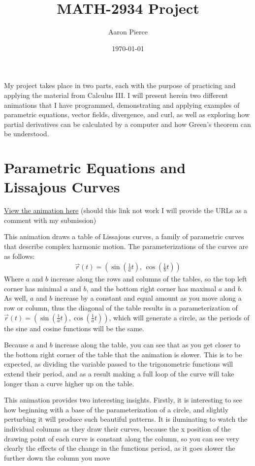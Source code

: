 \documentclass{article}
\title{MATH-2934 Project}
\author{Aaron Pierce}
\date{\today}
\begin{document}
    \maketitle

    My project takes place in two parts, each with the purpose of practicing and applying the material from Calculus III.
    I will present herein two different animations that I have programmed, demonstrating and applying examples of parametric equations, vector fields, divergence, and curl,
    as well as exploring how partial derivatives can be calculated by a computer and how Green's theorem can be understood.

    \section{Parametric Equations and Lissajous Curves}
    \underline{\href{https://saxten2011.github.io/AlmostLissajousCurves/}{View the animation here}} (should this link not work I will provide the URLs as a comment with my submission)

    This animation draws a table of Lissajous curves, a family of parametric curves that describe complex harmonic motion.
    The parameterizations of the curves are as follows:
    \begin{gather*}
        \vec{r}(t) = \left( \sin(\frac{1}{a} t),\, \cos(\frac{1}{b} t) \right)
    \end{gather*}
    Where $a$ and $b$ increase along the rows and columns of the tables, so the top left corner has minimal $a$ and $b$, and the bottom right corner has maximal $a$ and $b$.
    As well, $a$ and $b$ increase by a constant and equal amount as you move along a row or column, thus the diagonal of the table results in a parameterization of 
    $\vec{r}(t) = \left( \sin(\frac{1}{a} t), \cos(\frac{1}{a} t) \right)$, which will generate a circle, as the periods of the sine and cosine functions will be the same.

    Because $a$ and $b$ increase along the table, you can see that as you get closer to the bottom right corner of the table that the animation is slower.
    This is to be expected, as dividing the variable passed to the trigonometric functions will extend their period, and as a result making a full loop of the curve will take longer than a curve higher up on the table.

    This animation provides two interesting insights.
    Firstly, it is interesting to see how beginning with a base of the parameterization of a circle, and slightly perturbing it will produce such beautiful patterns.
    It is iluminating to watch the individual columns as they draw their curves, because the x position of the drawing point of each curve is constant along the column, so you can see very clearly the effects of the change in the functions period, as it goes slower the further down the column you move
\end{document}
